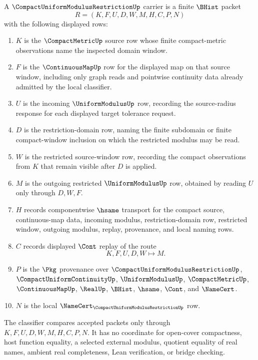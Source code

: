 \begin{definition}
\label{def:compact-uniform-modulus-restriction-carrier}
A $\CompactUniformModulusRestrictionUp$ carrier is a finite $\BHist$ packet
$$
R=(K,F,U,D,W,M,H,C,P,N)
$$
with the following displayed rows:
\begin{enumerate}
\item $K$ is the $\CompactMetricUp$ source row whose finite compact-metric observations name the inspected domain window.
\item $F$ is the $\ContinuousMapUp$ row for the displayed map on that source window, including only graph reads and pointwise continuity data already admitted by the local classifier.
\item $U$ is the incoming $\UniformModulusUp$ row, recording the source-radius response for each displayed target tolerance request.
\item $D$ is the restriction-domain row, naming the finite subdomain or finite compact-window inclusion on which the restricted modulus may be read.
\item $W$ is the restricted source-window row, recording the compact observations from $K$ that remain visible after $D$ is applied.
\item $M$ is the outgoing restricted $\UniformModulusUp$ row, obtained by reading $U$ only through $D,W,F$.
\item $H$ records componentwise $\hsame$ transport for the compact source, continuous-map data, incoming modulus, restriction-domain row, restricted window, outgoing modulus, replay, provenance, and local naming rows.
\item $C$ records displayed $\Cont$ replay of the route
$$
K,F,U,D,W \longmapsto M .
$$
\item $P$ is the $\Pkg$ provenance over $\CompactUniformModulusRestrictionUp$, $\CompactUniformContinuityUp$, $\UniformModulusUp$, $\CompactMetricUp$, $\ContinuousMapUp$, $\RealUp$, $\BHist$, $\hsame$, $\Cont$, and $\NameCert$.
\item $N$ is the local $\NameCert_{\CompactUniformModulusRestrictionUp}$ row.
\end{enumerate}
The classifier compares accepted packets only through $K,F,U,D,W,M,H,C,P,N$. It has no coordinate for open-cover compactness, host function equality, a selected external modulus, quotient equality of real names, ambient real completeness, Lean verification, or bridge checking.
\end{definition}

